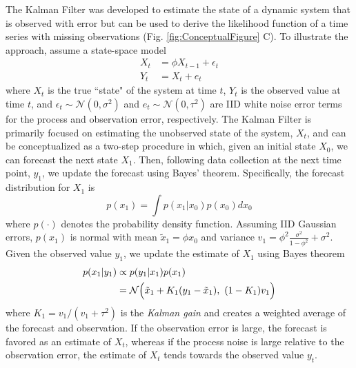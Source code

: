 \documentclass{article}
\begin{document}
\begin{linenumbers}
The Kalman Filter was developed to estimate the state of a dynamic system that is observed with error but can be used to derive the likelihood function of a time series with missing observations (Fig. \ref{fig:ConceptualFigure} C). To illustrate the approach, assume a state-space model
\begin{equation*}
    \begin{aligned}
        X_t &= \phi X_{t-1} + \epsilon_t\\
        Y_t &= X_t + e_t
    \end{aligned}
\end{equation*}
where $X_t$ is the true ``state" of the system at time $t$, $Y_t$ is the observed value at time $t$, and $\epsilon_t \sim \mathcal{N}(0, \sigma^2)$ and $e_t \sim \mathcal{N}(0, \tau^2)$ are IID white noise error terms for the process and observation error, respectively. The Kalman Filter is primarily focused on estimating the unobserved state of the system, $X_t$, and can be conceptualized as a two-step procedure in which, given an initial state $X_0$, we can forecast the next state $X_1$. Then, following data collection at the next time point, $y_1$, we update the forecast using Bayes' theorem. Specifically, the forecast distribution for $X_1$ is
\begin{equation*}
    p(x_1) = \int p(x_1 | x_0)p(x_0)dx_0
\end{equation*}
where $p(\cdot)$ denotes the probability density function. Assuming IID Gaussian errors, $p(x_1)$ is normal with mean ${\tilde x}_1 = \phi x_0$ and variance $v_1 = \phi^2 \frac{\sigma^2}{1 - \phi^2} + \sigma^2$. Given the observed value $y_1$, we update the estimate of $X_1$ using Bayes theorem
\begin{equation*}
    \begin{aligned}
        p(x_1 | y_1) &\propto p(y_1 | x_1) p(x_1)\\
        &= \mathcal{N}\Bigl(\tilde x_1 + K_1(y_1 - \tilde x_1),\ (1 - K_1)v_1 \Bigr)
    \end{aligned} 
\end{equation*}
where $K_1 = v_1 / (v_1 + \tau^2)$ is the \textit{Kalman gain} and creates a weighted average of the forecast and observation. If the observation error is large, the forecast is favored as an estimate of $X_t$, whereas if the process noise is large relative to the observation error, the estimate of $X_t$ tends towards the observed value $y_t$.

\end{linenumbers}
\end{document}
